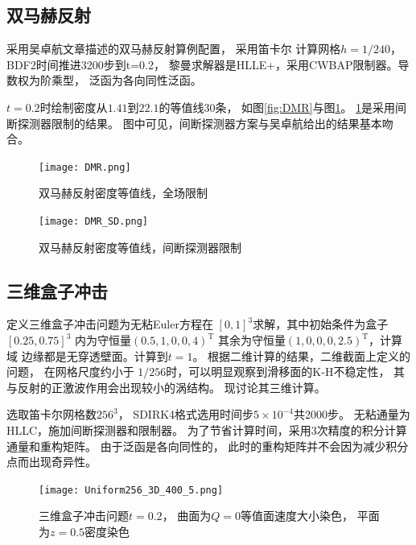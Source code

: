 \documentclass[UTF8,zihao=5]{ctexart} %
\newcommand{\trans}[0]{^\mathrm{T}}
\begin{document}
\subsection{双马赫反射}

采用吴卓航文章描述的双马赫反射算例配置，
采用笛卡尔
计算网格$h=1/240$，BDF2时间推进3200步到t=0.2，
黎曼求解器是HLLE+，采用CWBAP限制器。导数权为阶乘型，
泛函为各向同性泛函。

$t=0.2$时绘制密度从$1.41$到$22.1$的等值线30条，
如图\ref{fig:DMR}与图\ref{fig:DMR_SD}。
\ref{fig:DMR_SD}是采用间断探测器限制的结果。
图中可见，间断探测器方案与吴卓航给出的结果基本吻合。

\begin{figure}[H]
    \begin{minipage}[c]{0.45\linewidth}  %
        \centering
        \texttt{[image: DMR.png]}
        \caption{双马赫反射密度等值线，全场限制}
        \label{fig:DMR}
    \end{minipage}
    \hfill %
    \begin{minipage}[c]{0.45\linewidth}  %
        \centering
        \texttt{[image: DMR\_SD.png]}
        \caption{双马赫反射密度等值线，间断探测器限制}
        \label{fig:DMR_SD}
    \end{minipage}
\end{figure}



\subsection{三维盒子冲击}

定义三维盒子冲击问题为无粘Euler方程在
$[0,1]^3$求解，其中初始条件为盒子$[0.25,0.75]^3$
内为守恒量$(0.5,1,0,0,4)\trans$
其余为守恒量$(1,0,0,0,2.5)\trans$，计算域
边缘都是无穿透壁面。计算到$t=1$。
根据二维计算的结果，二维截面上定义的问题，
在网格尺度约小于
$1/256$时，可以明显观察到滑移面的K-H不稳定性，
其与反射的正激波作用会出现较小的涡结构。
现讨论其三维计算。

选取笛卡尔网格数$256^3$，
SDIRK4格式选用时间步$5\times10^{-4}$共2000步。
无粘通量为HLLC，施加间断探测器和限制器。
为了节省计算时间，采用3次精度的积分计算通量和重构矩阵。
由于泛函是各向同性的，
此时的重构矩阵并不会因为减少积分点而出现奇异性。

\begin{figure}[htbp]
    \centering
    \texttt{[image: Uniform256\_3D\_400\_5.png]}  %
    \caption{三维盒子冲击问题$t=0.2$，
        曲面为$Q=0$等值面速度大小染色，
        平面为$z=0.5$密度染色}
    \label{fig:Uniform256_3D_400_5}
\end{figure}
\end{document}
